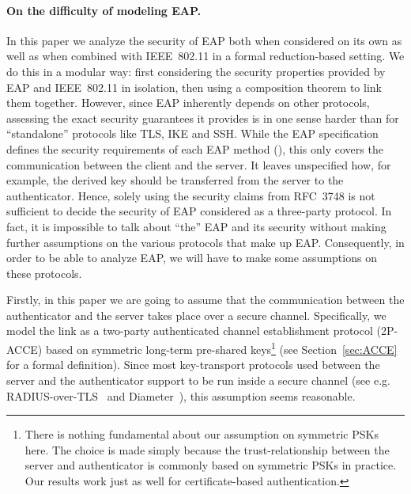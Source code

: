 \paragraph{On the difficulty of modeling EAP.}
In this paper we analyze the security of EAP
both when considered on its own as well as when combined with IEEE~802.11 in a formal reduction-based setting.
We do this in a modular way:
first considering the security properties provided by EAP and IEEE~802.11 in isolation,
then using a composition theorem to link them together.
However, 
since EAP inherently depends on other protocols,
assessing the exact security guarantees it provides is in one sense harder than for ``standalone'' protocols like TLS, IKE and SSH. 
While the EAP specification defines the security requirements of each EAP method (\cite[§7]{IETF:RFC3748:EAP}),
this only covers the communication between the client and the server.
It leaves unspecified how, for example, the derived key should be transferred from the server to the authenticator.
Hence, 
solely using the security claims from RFC~3748 is not sufficient to decide the security of EAP considered as a three-party protocol.
In fact,
it is impossible to talk about ``the'' EAP and its security without making further assumptions on the various protocols that make up EAP.
Consequently,
in order to be able to analyze EAP,
we will have to make some assumptions on these protocols.
 

Firstly,
in this paper we are going to assume that the communication between the authenticator and the server takes place over a secure channel.
Specifically, we model the link as a two-party authenticated channel establishment protocol (2P-ACCE) based on symmetric long-term pre-shared keys\footnote{There is nothing fundamental about our assumption on symmetric PSKs here.
The choice is made simply because the trust-relationship between the server and authenticator is commonly based on symmetric PSKs in practice.
Our results work just as well for certificate-based authentication.} (see Section~\ref{sec:ACCE} for a formal definition).
Since most key-transport protocols used between the server and the authenticator support to be run inside a secure channel
(see e.g. RADIUS-over-TLS~\cite{IETF:RFC:6614:RADIUS_over_TLS} and Diameter~\cite{IETF:RFC:6733:DIAMETER}),
this assumption seems reasonable.

